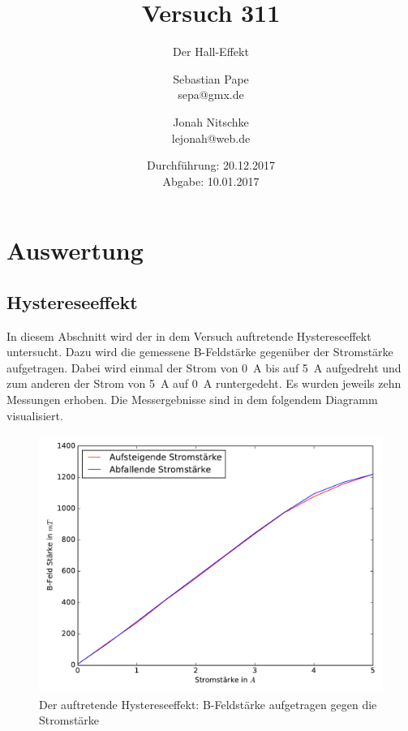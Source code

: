 



\title{Versuch 311}
\subtitle{Der Hall-Effekt}
\author{Sebastian Pape\\
        sepa@gmx.de \and
        Jonah Nitschke\\
        lejonah@web.de}
\date{Durchführung: 20.12.2017\\
      Abgabe: 10.01.2017}

\maketitle






\newpage

\section{Auswertung}

\subsection{Hystereseeffekt}

In diesem Abschnitt wird der in dem Versuch auftretende Hystereseeffekt untersucht.
Dazu wird die gemessene B-Feldstärke gegenüber der Stromstärke aufgetragen. Dabei
wird einmal der Strom von \SI{0}{\ampere} bis auf \SI{5}{\ampere} aufgedreht und zum
anderen der Strom von \SI{5}{\ampere} auf \SI{0}{\ampere} runtergedeht.
Es wurden jeweils zehn Messungen erhoben. Die Messergebnisse sind in dem folgendem
Diagramm visualisiert.

\begin{figure}
  \includegraphics[width=\textwidth]{Hysterese.pdf}
  \caption{Der auftretende Hystereseeffekt: B-Feldstärke aufgetragen gegen die Stromstärke}
  \label{fig:Hysterese}
\end{figure}

